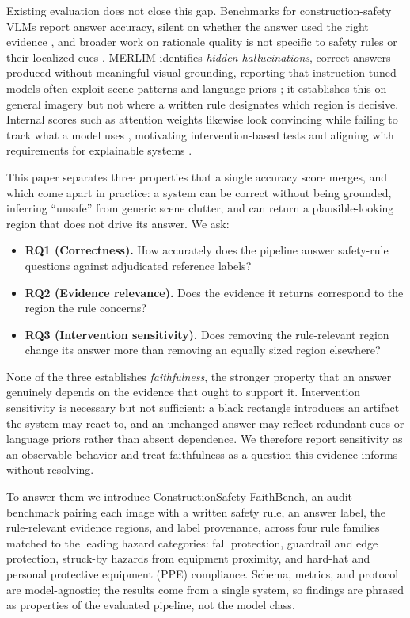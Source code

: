 \documentclass[12pt,letterpaper]{article}
\begin{document}
Existing evaluation does not close this gap. Benchmarks for construction-safety VLMs report answer accuracy, silent on whether the answer used the right evidence \citep{chen2025inspectors}, and broader work on rationale quality is not specific to safety rules or their localized cues \citep{li2025rationales}. MERLIM identifies \textit{hidden hallucinations}, correct answers produced without meaningful visual grounding, reporting that instruction-tuned models often exploit scene patterns and language priors \citep{villa2025merlim}; it establishes this on general imagery but not where a written rule designates which region is decisive. Internal scores such as attention weights likewise look convincing while failing to track what a model uses \citep{jain2019attention,wu2024faithfulness}, motivating intervention-based tests and aligning with requirements for explainable systems \citep{phillips2021principles}.

This paper separates three properties that a single accuracy score merges, and which come apart in practice: a system can be correct without being grounded, inferring ``unsafe'' from generic scene clutter, and can return a plausible-looking region that does not drive its answer. We ask:

\begin{itemize}[topsep=2pt,itemsep=1pt,parsep=0pt,leftmargin=*]
\item \textbf{RQ1 (Correctness).} How accurately does the pipeline answer safety-rule questions against adjudicated reference labels?
\item \textbf{RQ2 (Evidence relevance).} Does the evidence it returns correspond to the region the rule concerns?
\item \textbf{RQ3 (Intervention sensitivity).} Does removing the rule-relevant region change its answer more than removing an equally sized region elsewhere?
\end{itemize}

None of the three establishes \textit{faithfulness}, the stronger property that an answer genuinely depends on the evidence that ought to support it. Intervention sensitivity is necessary but not sufficient: a black rectangle introduces an artifact the system may react to, and an unchanged answer may reflect redundant cues or language priors rather than absent dependence. We therefore report sensitivity as an observable behavior and treat faithfulness as a question this evidence informs without resolving.

To answer them we introduce ConstructionSafety-FaithBench, an audit benchmark pairing each image with a written safety rule, an answer label, the rule-relevant evidence regions, and label provenance, across four rule families matched to the leading hazard categories: fall protection, guardrail and edge protection, struck-by hazards from equipment proximity, and hard-hat and personal protective equipment (PPE) compliance. Schema, metrics, and protocol are model-agnostic; the results come from a single system, so findings are phrased as properties of the evaluated pipeline, not the model class.
\end{document}
